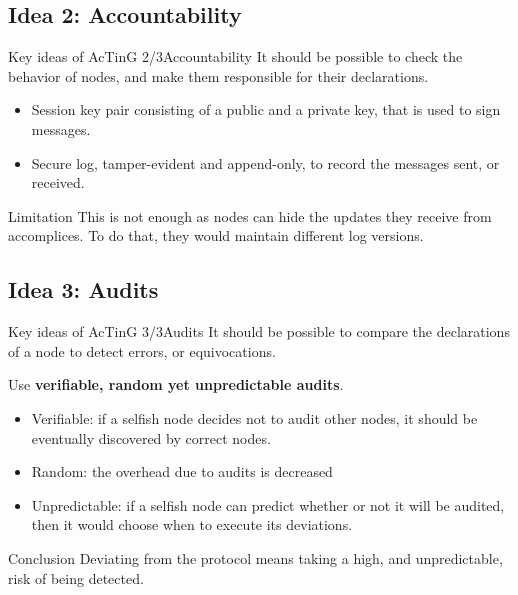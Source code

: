 \documentclass[10pt]{beamer}
\begin{document}
\subsection{Idea 2: Accountability}

\begin{frame}{Key ideas of AcTinG 2/3}{Accountability}
   \minipage[c][0.7\textheight][s]{\textwidth}
      It should be possible to check the behavior of nodes, and make them responsible for their declarations. 
      \begin{block}{}
      \begin{itemize}
        \item Session key pair consisting of a public and a private key, that is used to sign messages.
        \item Secure log, tamper-evident and append-only, to record the messages sent, or received. 
      \end{itemize}
      \end{block}
      \begin{block}{Limitation}
      This is not enough as nodes can hide the updates they receive from accomplices. To do that, they would maintain different log versions. 
      \end{block}
   \endminipage
\end{frame}

\subsection{Idea 3: Audits}

\begin{frame}{Key ideas of AcTinG 3/3}{Audits}
   \minipage[c][0.7\textheight][s]{\textwidth}
      It should be possible to compare the declarations of a node to detect errors, or equivocations. 
      \begin{block}{}
      Use \textbf{verifiable, random yet unpredictable audits}. 
      \begin{itemize}
        \item Verifiable: if a selfish node decides not to audit other nodes, it should be eventually discovered by correct nodes. 
        \item Random: the overhead due to audits is decreased
        \item Unpredictable: if a selfish node can predict whether or not it will be audited, then it would choose when to execute its deviations. 
      \end{itemize}
      \end{block}
      \begin{block}{Conclusion}
      Deviating from the protocol means taking a high, and unpredictable, risk of being detected. 
      \end{block}
   \endminipage
\end{frame}
\end{document}

